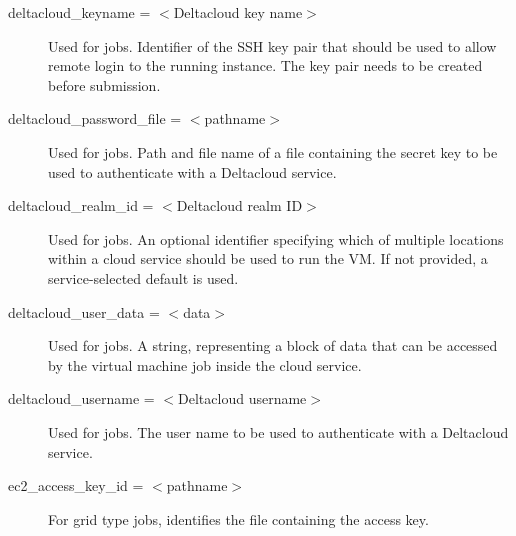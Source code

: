 \begin{description}
\label{condor-submit-deltacloud-keyname}
\item[deltacloud\_keyname = $<$Deltacloud key name$>$]
Used for  jobs.
Identifier of the SSH key pair that should be used to allow remote login
to the running instance. The key pair needs to be created before
submission.


\label{condor-submit-deltacloud-password-file}
\item[deltacloud\_password\_file = $<$pathname$>$]
Used for  jobs.
Path and file name of a file containing the secret key to be used to
authenticate with a Deltacloud service.


\label{condor-submit-deltacloud-realm-id}
\item[deltacloud\_realm\_id = $<$Deltacloud realm ID$>$]
Used for  jobs.
An optional identifier specifying which of multiple locations within a
cloud service should be used to run the VM. If not provided, a
service-selected default is used.


\label{condor-submit-deltacloud-user-data}
\item[deltacloud\_user\_data = $<$data$>$]
Used for  jobs.
A string, representing a block of data that can be accessed 
by the virtual machine job inside the cloud service.


\label{condor-submit-deltacloud-username}
\item[deltacloud\_username = $<$Deltacloud username$>$]
Used for  jobs.
The user name to be used to authenticate with a Deltacloud service.


\label{condor-submit-ec2-access-key-id}
\item[ec2\_access\_key\_id = $<$pathname$>$]
For grid type  jobs,
identifies the file containing the access key.  


\end{description}
